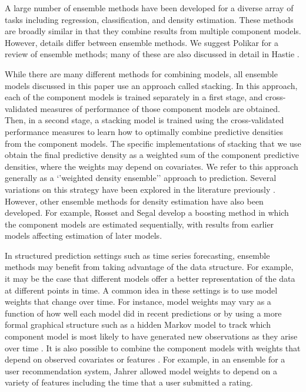 \documentclass[10pt,letterpaper]{article}
\begin{document}
A large number of ensemble methods have been developed for a diverse
array of tasks including regression, classification, and density
estimation. These methods are broadly similar in that they combine
results from multiple component models. However, details differ between
ensemble methods. We suggest Polikar \cite{polikar2006ensemble} for a
review of ensemble methods; many of these are also discussed in detail
in Hastie \etal \cite{Hastie2011}.

While there are many different methods for combining models, all
ensemble models discussed in this paper use an approach called stacking.
In this approach, each of the component models is trained separately in
a first stage, and cross-validated measures of performance of those
component models are obtained. Then, in a second stage, a stacking model
is trained using the cross-validated performance measures to learn how
to optimally combine predictive densities from the component models. The
specific implementations of stacking that we use obtain the final
predictive density as a weighted sum of the component predictive
densities, where the weights may depend on covariates. We refer to this
approach generally as a `'weighted density ensemble'' approach to
prediction. Several variations on this strategy have been explored in
the literature previously
\cite{smyth1999stackingDensityEstimators,  rigollet2007linearconvexaggregationdensity, ganti2011cake}.
However, other ensemble methods for density estimation have also been
developed. For example, Rosset and Segal \cite{rosset2002boosting}
develop a boosting method in which the component models are estimated
sequentially, with results from earlier models affecting estimation of
later models.

In structured prediction settings such as time series forecasting,
ensemble methods may benefit from taking advantage of the data
structure. For example, it may be the case that different models offer a
better representation of the data at different points in time. A common
idea in these settings is to use model weights that change over time.
For instance, model weights may vary as a function of how well each
model did in recent predictions \cite{herbster1998tracking} or by using
a more formal graphical structure such as a hidden Markov model to track
which component model is most likely to have generated new observations
as they arise over time
\cite{yamanishi2007dynamicmodelselection, cortes2014ensembleStructuredPrediction}.
It is also possible to combine the component models with weights that
depend on observed covariates or features \cite{Sill2009}. For example,
in an ensemble for a user recommendation system, Jahrer
\etal \cite{jahrer2010Netflix} allowed model weights to depend on a
variety of features including the time that a user submitted a rating.
\end{document}
